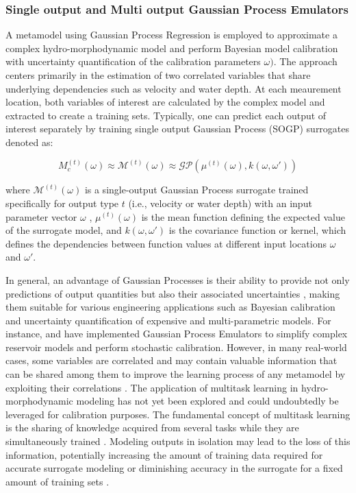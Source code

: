 \documentclass[draft,linenumbers,onecolumn]{agujournal2019} %
\begin{document}
\subsubsection{Single output and Multi output Gaussian Process Emulators}
\label{subsec:sec2.6.2}

A metamodel using Gaussian Process Regression is employed to approximate a complex hydro-morphodynamic model and perform Bayesian model calibration with uncertainty quantification of the calibration parameters \(\omega) \). The approach centers primarily in the estimation of two correlated variables that share underlying dependencies such as velocity and water depth. At each  meaurement location, both variables of interest are calculated by the complex model and extracted to create a training sets. Typically, one can predict each output of interest separately by training single output Gaussian Process (SOGP) surrogates denoted as:

\[
M_c^{(t)}(\omega) \approx \mathcal{M}^{(t)}(\omega) \approx \mathcal{GP}(\mu^{(t)}(\omega), k(\omega, \omega'))
\]

where \( \mathcal{M}^{(t)}(\omega) \) is a single-output Gaussian Process surrogate trained specifically for output type \( t \) (i.e., velocity or water depth) with an input parameter vector \( \omega \) , \( \mu^{(t)}(\omega) \) is the mean function defining the expected value of the surrogate model, and \( k(\omega, \omega') \) is the covariance function or kernel, which defines the dependencies between function values at different input locations \( \omega \) and \( \omega' \). 

In general, an advantage of Gaussian Processes is their ability to provide not only predictions of output quantities but also their associated uncertainties \cite{lindholm2022machine}, making them suitable for various engineering applications such as Bayesian calibration and uncertainty quantification of expensive and multi-parametric models. For instance,  and  have implemented Gaussian Process Emulators to simplify complex reservoir models and perform stochastic calibration. However, in many real-world cases, some variables are correlated and may contain valuable information that can be shared among them to improve the learning process of any metamodel by exploiting their correlations \cite{breiman1997predicting}. The application of multitask learning in hydro-morphodynamic modeling has not yet been explored and could undoubtedly be leveraged for calibration purposes. The fundamental concept of multitask learning is the sharing of knowledge acquired from several tasks while they are simultaneously trained \cite{caruana1997multitask}. Modeling outputs in isolation may lead to the loss of this information, potentially increasing the amount of training data required for accurate surrogate modeling or diminishing accuracy in the surrogate for a fixed amount of training sets \cite{liu2018remarks}.
\end{document}
